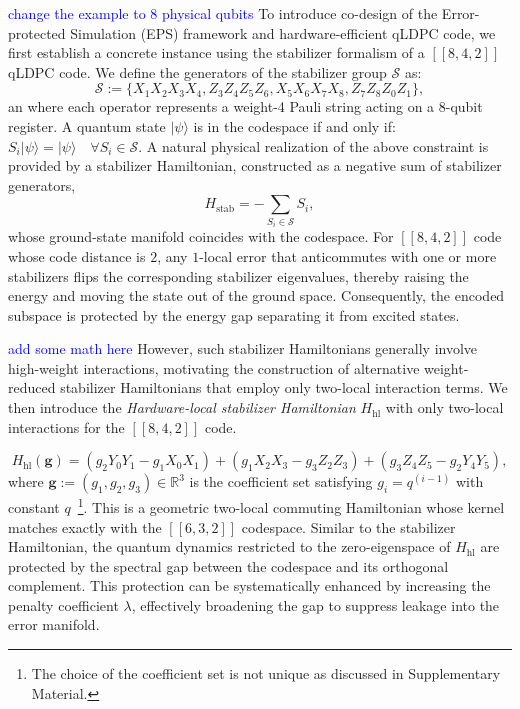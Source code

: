 \documentclass[%
10pt,tightenlines,
superscriptaddress,
 amsmath,amssymb,
 aps,
pra,
]{revtex4-2}
\newcommand{\sy}[1]{\textcolor{blue}{#1}}
\begin{document}
\sy{change the example to 8 physical qubits} To introduce co-design of the Error-protected Simulation (EPS) framework and hardware-efficient qLDPC code, we first establish a concrete instance using the stabilizer formalism of a $[[8,4,2]]$ qLDPC code. We define the generators of the stabilizer group $\mathcal{S}$ as:
\begin{equation}
    \mathcal{S} := \{X_1 X_2 X_3 X_4, Z_3 Z_4 Z_5 Z_6, X_5X_6X_7X_8, Z_7Z_8Z_0Z_1\},
\end{equation}an
where each operator represents a weight-4 Pauli string acting on a 8-qubit register. A quantum state $|\psi\rangle$ is in the codespace if and only if: $S_i|\psi\rangle = |\psi\rangle \quad \forall S_i \in \mathcal{S}.$ A natural physical realization of the above constraint is provided by a stabilizer Hamiltonian, constructed as a negative sum of stabilizer generators,
\begin{equation}
    H_{\text{stab}} = -\sum_{S_i \in \mathcal{S}} S_i, 
\end{equation}
whose ground-state manifold coincides with the codespace. For $[[8,4,2]]$ code whose code distance is $2$, any $1$-local error that anticommutes with one or more stabilizers flips the corresponding stabilizer eigenvalues, thereby raising the energy and moving the state out of the ground space. Consequently, the encoded subspace is protected by the energy gap separating it from excited states. 

\sy{add some math here}
However, such stabilizer Hamiltonians generally involve high-weight interactions, motivating the construction of alternative weight-reduced stabilizer Hamiltonians that employ only two-local interaction terms. We then introduce the \textit{Hardware-local stabilizer Hamiltonian} $H_{\text{hl}}$ with only two-local interactions for the $[[8,4,2]]$ code. 




\begin{equation}\label{eq:hardware-local H}
    H_{\text{hl}}(\mathbf{g})=  (g_2Y_0Y_1-g_1X_0X_1)+(g_1X_2X_3-g_3Z_2Z_3)+(g_3Z_4Z_5-g_2Y_4Y_5),
\end{equation}
where $\mathbf{g}:=(g_1,g_2,g_3)\in \mathbb{R}^3$ is the coefficient set satisfying $g_i = q^{(i-1)}$ with constant $q$~\footnote{The choice of the coefficient set is not unique as discussed in Supplementary Material.}. This is a geometric two-local commuting Hamiltonian whose kernel matches exactly with the $[[6,3,2]]$ codespace. Similar to the stabilizer Hamiltonian, the quantum dynamics restricted to the zero-eigenspace of $H_{\text{hl}}$ are protected by the spectral gap between the codespace and its orthogonal complement. This protection can be systematically enhanced by increasing the penalty coefficient $\lambda$, effectively broadening the gap to suppress leakage into the error manifold. 
\end{document}
